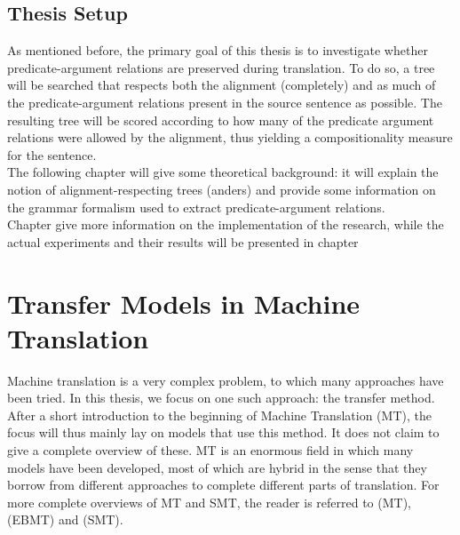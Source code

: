 \documentclass{report}
\theoremstyle{definition}
\theoremstyle{plain}
\begin{document}
\section*{Thesis Setup}

As mentioned before, the primary goal of this thesis is to investigate whether predicate-argument relations are preserved during translation. To do so, a tree will be searched that respects both the alignment (completely) and as much of the predicate-argument relations present in the source sentence as possible. The resulting tree will be scored according to how many of the predicate argument relations were allowed by the alignment, thus yielding a compositionality measure for the sentence.\\
The following chapter will give some theoretical background: it will explain the notion of alignment-respecting trees (anders) and provide some information on the grammar formalism used to extract predicate-argument relations.\\
Chapter give more information on the implementation of the research, while the actual experiments and their results will be presented in chapter 






\chapter{Transfer Models in Machine Translation}

Machine translation is a very complex problem, to which many approaches have been tried. In this thesis, we focus on one such approach: the transfer method.   After a short introduction to the beginning of Machine Translation (MT), the focus will thus mainly lay on models that use this method. It does not claim to give a complete overview of these. MT is an enormous field in which many models have been developed, most of which are hybrid in the sense that they borrow from different approaches to complete different parts of translation. For more complete overviews of MT and SMT, the reader is referred to \cite{hutchins1992introduction} (MT), \cite{somers1999review} (EBMT) and \cite{koehn2008statistical} (SMT).
\end{document}
